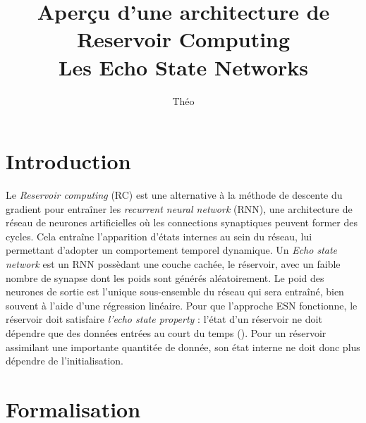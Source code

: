 \documentclass[12pt]{article}
\title{Aperçu d'une architecture de Reservoir Computing\\Les Echo State Networks}
\author{Théo \bsc{Biasutto--Lervat}}
\date{}
\begin{document}
\maketitle

\section{Introduction}

Le \textit{Reservoir computing} (RC) est une alternative à la méthode de descente du gradient pour entraîner les \textit{recurrent neural network} (RNN), une architecture de réseau de neurones artificielles où les connections synaptiques peuvent former des cycles. Cela entraîne l'apparition d'états internes au sein du réseau, lui permettant d'adopter un comportement temporel dynamique.\newline
Un \textit{Echo state network} est un RNN possèdant une couche cachée, le réservoir, avec un faible nombre de synapse dont les poids sont générés aléatoirement. Le poid des neurones de sortie est l'unique sous-ensemble du réseau qui sera entraîné, bien souvent à l'aide d'une régression linéaire.\newline
Pour que l'approche ESN fonctionne, le réservoir doit satisfaire \textit{l'echo state property} : l'état d'un réservoir ne doit dépendre que des données entrées au court du temps (\cite{Jaeger10}). Pour un réservoir assimilant une importante quantitée de donnée, son état interne ne doit donc plus dépendre de l'initialisation.


\section{Formalisation}
\end{document}

